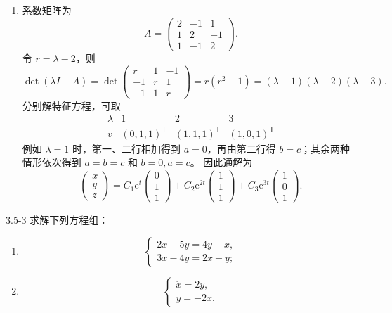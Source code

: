 \documentclass[UTF8,a4paper,11pt]{ctexart}
\newcommand{\e}{\mathrm e}
\begin{document}
\begin{solution}
\begin{enumerate}[label=(\arabic*)]
\item 系数矩阵为
\[
A=\begin{pmatrix}2&-1&1\\1&2&-1\\1&-1&2\end{pmatrix}.
\]
令 $r=\lambda-2$，则
\[
\det(\lambda I-A)
=\det\begin{pmatrix}r&1&-1\\-1&r&1\\-1&1&r\end{pmatrix}
=r(r^2-1)
=(\lambda-1)(\lambda-2)(\lambda-3).
\]
分别解特征方程，可取
\[
\begin{array}{c|ccc}
\lambda&1&2&3\\ \hline
v&(0,1,1)^{\mathsf T}&(1,1,1)^{\mathsf T}&(1,0,1)^{\mathsf T}
\end{array}
\]
例如 $\lambda=1$ 时，第一、二行相加得到 $a=0$，再由第二行得 $b=c$；其余两种情形依次得到 $a=b=c$ 和 $b=0,a=c$。
因此通解为
\[
\boxed{
\begin{pmatrix}x\\y\\z\end{pmatrix}
=C_1\e^t\begin{pmatrix}0\\1\\1\end{pmatrix}
+C_2\e^{2t}\begin{pmatrix}1\\1\\1\end{pmatrix}
+C_3\e^{3t}\begin{pmatrix}1\\0\\1\end{pmatrix}.}
\]
\end{enumerate}
\end{solution}

\begin{problem}{3.5-3}
求解下列方程组：
  \begin{enumerate}[label=(\arabic*)]
    \item
    \[
    \begin{cases}
      2\dot x-5\dot y=4y-x,\\
      3\dot x-4\dot y=2x-y;
    \end{cases}
    \]

    \item
    \[
    \begin{cases}
      \ddot x=2y,\\
      \ddot y=-2x.
    \end{cases}
    \]
  \end{enumerate}
\end{problem}
\end{document}
